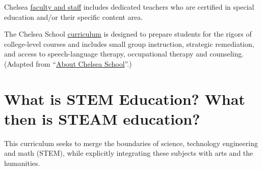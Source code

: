 \documentclass[letterpaper,10pt,english]{sphinxmanual}
\begin{document}
Chelsea \href{http://chelseaschool.edu/about/bios}{faculty and staff} includes dedicated teachers who are certified in special education and/or their specific content area.

The Chelsea School \href{http://chelseaschool.edu/academics}{curriculum} is designed to prepare students for the rigors of college-level courses and includes small group instruction, strategic remediation, and access to speech-language therapy, occupational therapy and counseling. (Adapted from ``\href{http://chelseaschool.edu/about}{About Chelsea School}''.)


\section{What is STEM Education? What then is STEAM education?}
\label{faq:what-is-stem-education-what-then-is-steam-education}
This curriculum seeks to merge the boundaries of science, technology engineering and math (STEM), while explicitly integrating these subjects with arts and the humanities.
\end{document}

